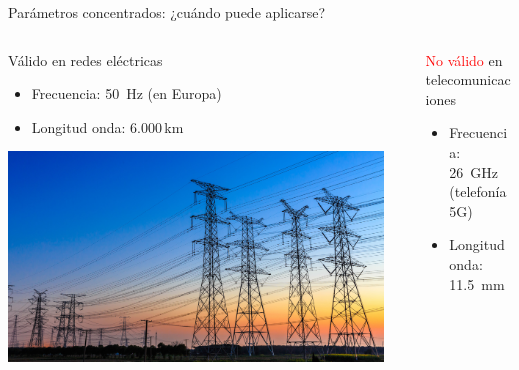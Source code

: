 \documentclass[aspectratio=169, xcolor={usenames,svgnames,dvipsnames}]{beamer}
\begin{document}
\begin{frame}{Parámetros concentrados: \hspace{5mm} ¿cuándo puede aplicarse?}
    \begin{columns}[T]
    \begin{column}{0.4\columnwidth}
        \alert{Válido} en redes eléctricas
        \begin{itemize}
            \item \alert{Frecuencia}: \SI{50}{\hertz} (en Europa)
            \item \alert{Longitud onda}: $6.000$\,\si{\kilo\meter}
        \end{itemize}    
        \begin{center}
            \includegraphics[height=0.35\textheight]{../figs/red_electrica.jpg} 
        \end{center}        
    \end{column}  
    \vrule
    \begin{column}{0.01\columnwidth}
    \end{column}     
    \begin{column}{0.49\columnwidth}
        \alert{\textcolor{red}{No válido}} en telecomunicaciones
        \begin{itemize}
            \item \alert{Frecuencia}: \SI{26}{\giga\hertz} (telefonía 5G)
            \item \alert{Longitud onda}: \SI{11.5}{\milli\meter}
        \end{itemize}

\end{column}
\end{columns}
\end{frame}
\end{document}
